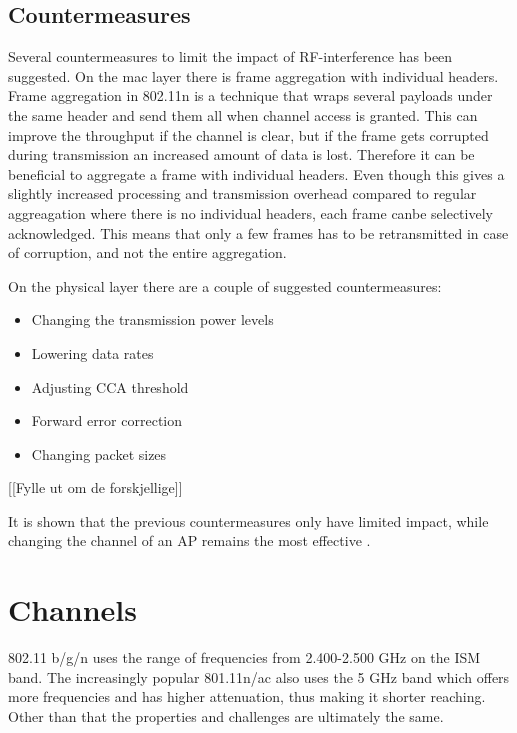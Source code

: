 	\subsection{Countermeasures}
	Several countermeasures to limit the impact of RF-interference has been suggested.
	On the mac layer there is frame aggregation with individual headers.
	Frame aggregation in 802.11n is a technique that wraps several payloads under the same
	header and send them all when channel access is granted. This can improve the throughput
	if the channel is clear, but if the frame gets corrupted during transmission
	an increased amount of data is lost.
	Therefore it can be beneficial to aggregate a frame with individual headers.
	Even though this gives a slightly increased processing and transmission overhead
	compared to regular aggreagation where there is no individual headers, 
	each frame canbe selectively acknowledged.
	This means that only a few frames has to be retransmitted in case of corruption,
	and not the entire aggregation. 

	On the physical layer there are a couple of suggested countermeasures:
	\begin{itemize}
	\item Changing the transmission power levels
	\item Lowering data rates
	\item Adjusting CCA threshold
	\item Forward error correction
	\item Changing packet sizes
	\end{itemize}
	[[Fylle ut om de forskjellige]]

	It is shown that the previous countermeasures only have limited
	impact, while changing the channel of an AP remains the most effective
	\cite{impactRF}. 
	\section{Channels} 
	802.11 b/g/n uses the range of frequencies from 2.400-2.500 GHz on the ISM band. The increasingly popular 801.11n/ac also uses the 5 GHz band which offers more frequencies and has higher attenuation, thus making it shorter reaching. Other than that the properties and challenges are ultimately the same. 

